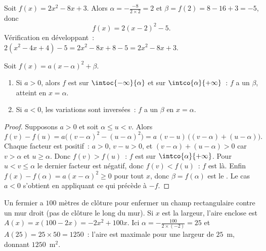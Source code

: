 \begin{example}\label{ex:g11:quad:canonical}
Soit $f(x) = 2x^2 - 8x + 3$. Alors $\alpha = -\frac{-8}{2 \times 2} = 2$
et $\beta = f(2) = 8 - 16 + 3 = -5$, donc
\[
f(x) = 2(x - 2)^2 - 5 .
\]
Vérification en développant~: $2(x^2 - 4x + 4) - 5 = 2x^2 - 8x + 8 - 5 =
2x^2 - 8x + 3$.
\end{example}

\begin{proposition}\label{prop:g11:quad:variations}
Soit $f(x) = a(x-\alpha)^2 + \beta$.
\begin{enumerate}
  \item Si $a > 0$, alors $f$ est  sur
        $\intoc{-\infty}{\alpha}$ et  sur
        $\intco{\alpha}{+\infty}$~: $f$ a un \emph{} $\beta$,
        atteint en $x = \alpha$.
  \item Si $a < 0$, les variations sont inversées~: $f$ a un
        \emph{} $\beta$ en $x = \alpha$.
\end{enumerate}
\end{proposition}

\begin{proof}
Supposons $a > 0$ et soit $\alpha \leq u < v$. Alors
\[
f(v) - f(u) = a\bigl((v-\alpha)^2 - (u-\alpha)^2\bigr)
= a\,(v - u)\,\bigl((v-\alpha) + (u-\alpha)\bigr).
\]
Chaque facteur est positif~: $a > 0$, $v - u > 0$, et
$(v-\alpha) + (u-\alpha) > 0$ car $v > \alpha$ et $u \geq \alpha$. Donc
$f(v) > f(u)$~: $f$ est  sur $\intco{\alpha}{+\infty}$. Pour
$u < v \leq \alpha$ le dernier facteur est négatif, donc
$f(v) < f(u)$~: $f$ est  là. Enfin
$f(x) - f(\alpha) = a(x-\alpha)^2 \geq 0$ pour tout $x$, donc
$\beta = f(\alpha)$ est le . Le cas $a < 0$ s'obtient en appliquant
ce qui précède à $-f$.
\end{proof}

\begin{example}
Un fermier a $100$ mètres de clôture pour enfermer un champ rectangulaire
contre un mur droit (pas de clôture le long du mur). Si $x$ est la
largeur, l'aire enclose est $A(x) = x(100 - 2x) = -2x^2 + 100x$. Ici
$\alpha = -\frac{100}{2\times(-2)} = 25$ et $A(25) = 25 \times 50 =
1250$~: l'aire est maximale pour une largeur de $25$~m, donnant
$1250$~m$^2$.
\end{example}

